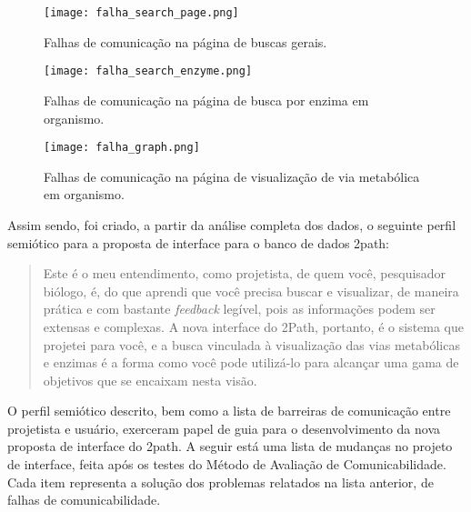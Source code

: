 \newpage

\begin{figure}[!h]
	\centering
	\texttt{[image: falha\_search\_page.png]}
	\caption{Falhas de comunicação na página de buscas gerais.}
	\label{fig:falha_search_page}
\end{figure}

\begin{figure}[!h]
	\centering
	\texttt{[image: falha\_search\_enzyme.png]}
	\caption{Falhas de comunicação na página de busca por enzima em organismo.}
	\label{fig:falha_search_enzyme}
\end{figure}

\newpage

\begin{figure}[!h]
	\centering
	\texttt{[image: falha\_graph.png]}
	\caption{Falhas de comunicação na página de visualização de via metabólica em organismo.}
	\label{fig:falha_graph}
\end{figure}

\indent Assim sendo, foi criado, a partir da análise completa dos dados, o seguinte perfil semiótico para a proposta de interface para o banco de dados 2path:

\begin{quote}
	Este é o meu entendimento, como projetista, de quem você, pesquisador biólogo, é, do que aprendi que você precisa buscar e visualizar, de maneira prática e com bastante \textit{feedback} legível, pois as informações podem ser extensas e complexas. A nova interface do 2Path, portanto, é o sistema que projetei para você, e a busca vinculada à visualização das vias metabólicas e enzimas é a forma como você pode utilizá-lo para alcançar uma gama de objetivos que se encaixam nesta visão.
\end{quote}

\indent O perfil semiótico descrito, bem como a lista de barreiras de comunicação entre projetista e usuário, exerceram papel de guia para o desenvolvimento da nova proposta de interface do 2path. A seguir está uma lista de mudanças no projeto de interface, feita após os testes do Método de Avaliação de Comunicabilidade. Cada item representa a solução dos problemas relatados na lista anterior, de falhas de comunicabilidade.

